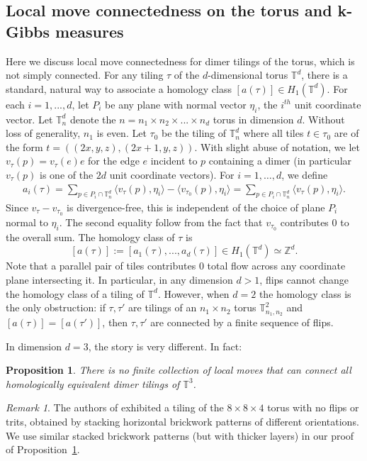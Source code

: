 \documentclass[11pt]{article}
\newtheorem{prop}[thm]{Proposition}
\theoremstyle{remark}
\newtheorem{rem}[thm]{Remark}
\theoremstyle{definition}
\newcommand{\m}[1]{\mathbb{#1}}
\begin{document}
\subsection{Local move connectedness on the torus and k-Gibbs measures}

Here we discuss local move connectedness for dimer tilings of the torus, which is not simply connected. For any tiling $\tau$ of the $d$-dimensional torus $\mathbb T^d$, there is a standard, natural way to associate a homology class $[ a(\tau)]\in H_1(\mathbb T^d)$. For each $i=1,...,d$, let $P_i$ be any plane with normal vector ${\eta}_i$, the $i^{th}$ unit coordinate vector. Let $\mathbb T_{{n}}^d$ denote the $ n = n_1\times n_2\times ... 
\times n_d$ torus in dimension $d$. Without loss of generality, $n_1$ is even. Let $\tau_0$ be the tiling of $\mathbb T_{{n}}^d$ where all tiles $t\in \tau_0$ are of the form $t = ((2x,y,z),(2x+1,y,z))$. With slight abuse of notation, we let $v_\tau(p) = v_\tau(e) e$ for the edge $e$ incident to $p$ containing a dimer (in particular $v_\tau(p)$ is one of the $2d$ unit coordinate vectors). For $i=1,\dots, d$, we define
\begin{align*}
    a_i(\tau) = \sum_{p\in P_i\cap \mathbb T_{ n}^d}  \langle v_{\tau}(p),\eta_i\rangle - \langle v_{\tau_0}(p) ,\eta_i\rangle =\sum_{p\in P_i\cap \mathbb T_{ n}^d} \langle v_{\tau}(p), \eta_i\rangle.
\end{align*}
Since $v_{\tau}-v_{\tau_0}$ is divergence-free, this is independent of the choice of plane $P_i$ normal to $\eta_i$. The second equality follow from the fact that $v_{\tau_0}$ contributes $0$ to the overall sum. The homology class of $\tau$ is
$$[{a}(\tau)]:=[a_1(\tau),...,a_d(\tau)]\in H_1(\mathbb T^d) \simeq \mathbb Z^d.$$
Note that a parallel pair of tiles contributes $0$ total flow across any coordinate plane intersecting it. In particular, in any dimension $d>1$, flips cannot change the homology class of a tiling of $\mathbb T^d$. However, when $d=2$ the homology class is the only obstruction: if $\tau,\tau'$ are tilings of an $n_1\times n_2$ torus $\mathbb T_{n_1,n_2}^2$ and $[{a}(\tau)]=[{a}(\tau')]$, then $\tau,\tau'$ are connected by a finite sequence of flips. 

In dimension $d=3$, the story is very different. In fact:
\begin{prop}\label{prop:three_torus_no_finite}
    There is no finite collection of local moves that can connect all homologically equivalent dimer tilings of $\m T^3$.
\end{prop}
\begin{rem} The authors of \cite{freire2022connectivity} exhibited a tiling of the $8\times 8\times 4$ torus with no flips or trits, obtained by stacking horizontal brickwork patterns of different orientations. We use similar stacked brickwork patterns (but with thicker layers) in our proof of Proposition~\ref{prop:three_torus_no_finite}. 
\end{rem}
\end{document}
